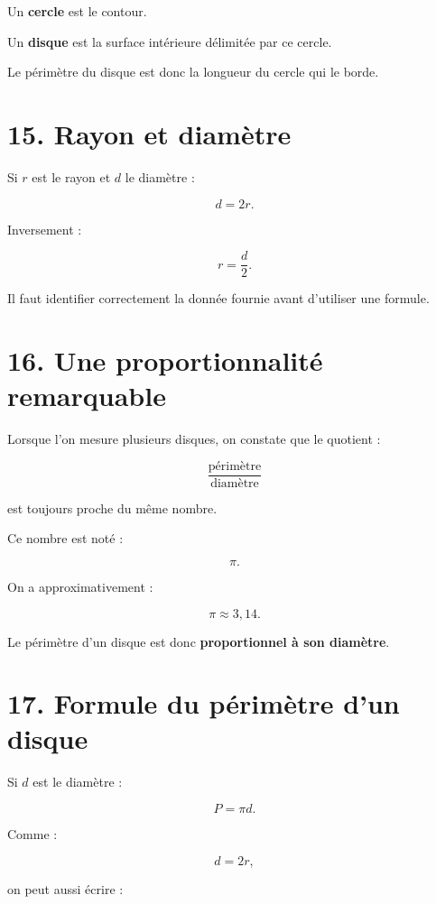 Un \textbf{cercle} est le contour.

Un \textbf{disque} est la surface intérieure délimitée par ce cercle.

Le périmètre du disque est donc la longueur du cercle qui le borde.


\section{15. Rayon et diamètre}

Si $r$ est le rayon et $d$ le diamètre :

\[
\boxed{d=2r}.
\]

Inversement :

\[
\boxed{r=\dfrac{d}{2}}.
\]

Il faut identifier correctement la donnée fournie avant d’utiliser une formule.

\section{16. Une proportionnalité remarquable}

Lorsque l’on mesure plusieurs disques, on constate que le quotient :

\[
\dfrac{\text{périmètre}}{\text{diamètre}}
\]

est toujours proche du même nombre.

Ce nombre est noté :

\[
\pi.
\]

On a approximativement :

\[
\pi\approx3{,}14.
\]

Le périmètre d’un disque est donc \textbf{proportionnel à son diamètre}.

\section{17. Formule du périmètre d’un disque}

Si $d$ est le diamètre :

\[
\boxed{P=\pi d}.
\]

Comme :

\[
d=2r,
\]

on peut aussi écrire :

